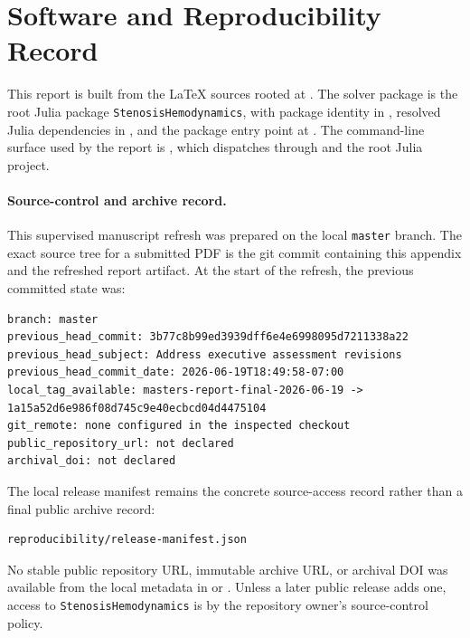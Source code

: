 \section{Software and Reproducibility Record}
\label{app:code-and-ai-use}

This report is built from the \LaTeX{} sources rooted at
. The solver package is the root Julia package
\texttt{StenosisHemodynamics}, with package identity in ,
resolved Julia dependencies in , and the package entry point
at . The command-line surface used by the
report is , which dispatches through
 and the root Julia project.

\paragraph*{Source-control and archive record.}
This supervised manuscript refresh was prepared on the local
\texttt{master} branch. The exact source tree for a submitted PDF is the git
commit containing this appendix and the refreshed report artifact. At the start
of the refresh, the previous committed state was:
\begin{lstlisting}[basicstyle=\ttfamily\footnotesize,breaklines=true]
branch: master
previous_head_commit: 3b77c8b99ed3939dff6e4e6998095d7211338a22
previous_head_subject: Address executive assessment revisions
previous_head_commit_date: 2026-06-19T18:49:58-07:00
local_tag_available: masters-report-final-2026-06-19 -> 1a15a52d6e986f08d745c9e40ecbcd04d4475104
git_remote: none configured in the inspected checkout
public_repository_url: not declared
archival_doi: not declared
\end{lstlisting}
The local release manifest remains the concrete source-access record rather
than a final public archive record:
\begin{lstlisting}[basicstyle=\ttfamily\footnotesize,breaklines=true]
reproducibility/release-manifest.json
\end{lstlisting}
No stable public repository URL, immutable archive URL, or archival DOI was
available from the local metadata in  or
. Unless a later public release adds
one, access to \texttt{StenosisHemodynamics} is by the repository owner's
source-control policy.

